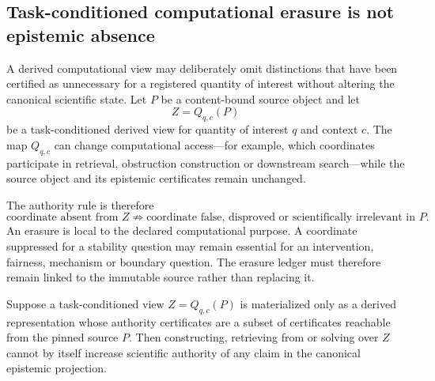 \subsection{Task-conditioned computational erasure is not epistemic absence}
\label{sec:task-conditioned-erasure-authority}

A derived computational view may deliberately omit distinctions that have been certified as unnecessary for a registered quantity of interest without altering the canonical scientific state. Let $P$ be a content-bound source object and let
\[
Z=Q_{q,c}(P)
\]
be a task-conditioned derived view for quantity of interest $q$ and context $c$. The map $Q_{q,c}$ can change computational access---for example, which coordinates participate in retrieval, obstruction construction or downstream search---while the source object and its epistemic certificates remain unchanged.

The authority rule is therefore
\[
\text{coordinate absent from }Z
\not\Rightarrow
\text{coordinate false, disproved or scientifically irrelevant in }P.
\]
An erasure is local to the declared computational purpose. A coordinate suppressed for a stability question may remain essential for an intervention, fairness, mechanism or boundary question. The erasure ledger must therefore remain linked to the immutable source rather than replacing it.

\begin{proposition}
Suppose a task-conditioned view $Z=Q_{q,c}(P)$ is materialized only as a derived representation whose authority certificates are a subset of certificates reachable from the pinned source $P$. Then constructing, retrieving from or solving over $Z$ cannot by itself increase scientific authority of any claim in the canonical epistemic projection.
\end{proposition}

